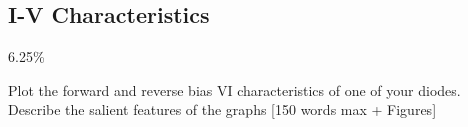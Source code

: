 \subsection{I-V Characteristics}
\label{sec:test:iv}

6.25\%

Plot the forward and reverse bias VI characteristics of one of your diodes. Describe the salient features of the graphs [150 words max + Figures]


